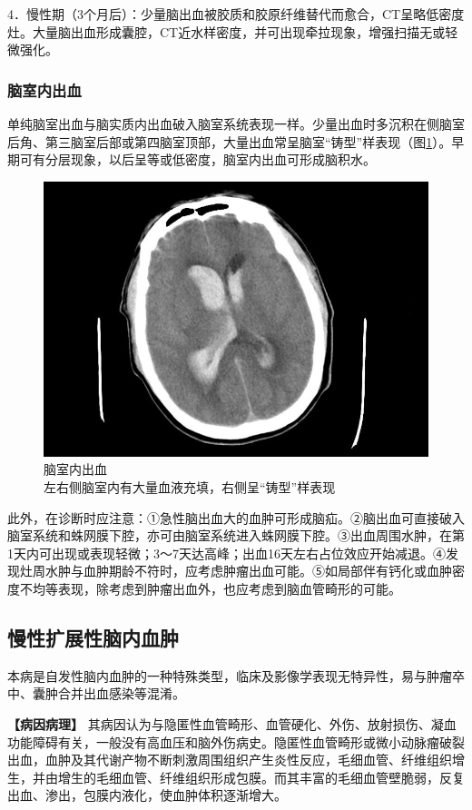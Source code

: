4．慢性期（3个月后）：少量脑出血被胶质和胶原纤维替代而愈合，CT呈略低密度灶。大量脑出血形成囊腔，CT近水样密度，并可出现牵拉现象，增强扫描无或轻微强化。

\subsubsection{脑室内出血}

单纯脑室出血与脑实质内出血破入脑室系统表现一样。少量出血时多沉积在侧脑室后角、第三脑室后部或第四脑室顶部，大量出血常呈脑室“铸型”样表现（图\ref{fig2-25}）。早期可有分层现象，以后呈等或低密度，脑室内出血可形成脑积水。

\begin{figure}[!htbp]
 \centering
 \includegraphics[width=.7\textwidth,height=\textheight,keepaspectratio]{./images/Image00043.jpg}
 \captionsetup{justification=centering}
 \caption{脑室内出血\\{\small 左右侧脑室内有大量血液充填，右侧呈“铸型”样表现}}
 \label{fig2-25}
  \end{figure} 

此外，在诊断时应注意：①急性脑出血大的血肿可形成脑疝。②脑出血可直接破入脑室系统和蛛网膜下腔，亦可由脑室系统进入蛛网膜下腔。③出血周围水肿，在第1天内可出现或表现轻微；3～7天达高峰；出血16天左右占位效应开始减退。④发现灶周水肿与血肿期龄不符时，应考虑肿瘤出血可能。⑤如局部伴有钙化或血肿密度不均等表现，除考虑到肿瘤出血外，也应考虑到脑血管畸形的可能。

\subsection{慢性扩展性脑内血肿}

本病是自发性脑内血肿的一种特殊类型，临床及影像学表现无特异性，易与肿瘤卒中、囊肿合并出血感染等混淆。

\textbf{【病因病理】}
其病因认为与隐匿性血管畸形、血管硬化、外伤、放射损伤、凝血功能障碍有关，一般没有高血压和脑外伤病史。隐匿性血管畸形或微小动脉瘤破裂出血，血肿及其代谢产物不断刺激周围组织产生炎性反应，毛细血管、纤维组织增生，并由增生的毛细血管、纤维组织形成包膜。而其丰富的毛细血管壁脆弱，反复出血、渗出，包膜内液化，使血肿体积逐渐增大。

